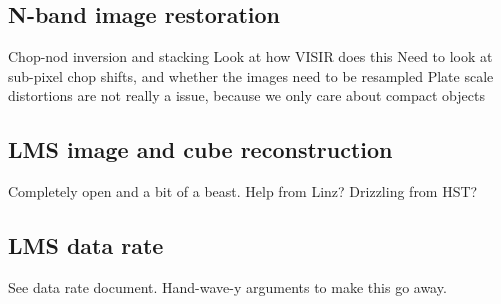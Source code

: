 \subsection{N-band image restoration}

Chop-nod inversion and stacking
Look at how VISIR does this
Need to look at sub-pixel chop shifts, and whether the images need to be resampled
Plate scale distortions are not really a issue, because we only care about compact objects

\subsection{LMS image and cube reconstruction}

Completely open and a bit of a beast. 
Help from Linz?
Drizzling from HST?

\subsection{LMS data rate}

See data rate document. 
Hand-wave-y arguments to make this go away.


